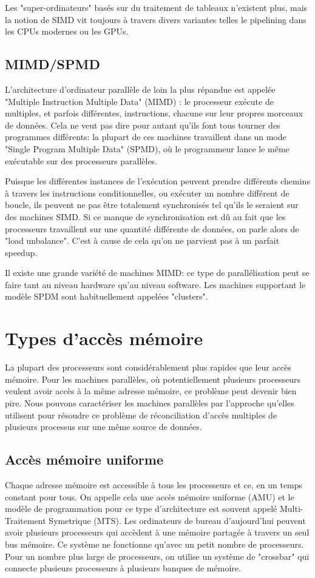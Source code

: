 	Les "super-ordinateurs" basés sur du traitement de tableaux n'existent plus, mais la notion de SIMD vit toujours à travers divers variantes telles le pipelining dans les CPUs modernes ou les GPUs.

	\subsection{MIMD/SPMD}
	L'architecture d'ordinateur parallèle de loin la plus répandue est appelée "Multiple Instruction Multiple Data" (MIMD) : le processeur exécute de multiples, et parfois différentes, instructions, chacune sur leur propres morceaux de données. Cela ne veut pas dire pour autant qu'ils font tous tourner des programmes différents: la plupart de ces machines travaillent dans un mode "Single Program Multiple Data" (SPMD), où le programmeur lance le même exécutable sur des processeurs parallèles.
	
	Puisque les différentes instances de l'exécution peuvent prendre différents chemins à travers les instructions conditionnelles, ou exécuter un nombre différent de boucle, ils peuvent ne pas être totalement synchronisés tel qu'ils le seraient sur des machines SIMD. Si ce manque de synchronisation est dû au fait que les processeurs travaillent sur une quantité différente de données, on parle alors de "load unbalance". C'est à cause de cela qu'on ne parvient pas à un parfait speedup.
	
	Il existe une grande variété de machines MIMD: ce type de parallélisation peut se faire tant au niveau hardware qu'au niveau software. Les machines supportant le modèle SPDM sont habituellement appelées "clusters".
	 
\section{Types d'accès mémoire}
La plupart des processeurs sont considérablement plus rapides que leur accès mémoire. Pour les machines parallèles, où potentiellement plusieurs processeurs veulent avoir accès à la même adresse mémoire, ce problème peut devenir bien pire. Nous pouvons caractériser les machines parallèles par l'approche qu'elles utilisent pour résoudre ce problème de réconciliation d'accès multiples de plusieurs processus sur une même source de données.

	\subsection{Accès mémoire uniforme}
	Chaque adresse mémoire est accessible à tous les processeurs et ce, en un temps constant pour tous. On appelle cela une accès mémoire uniforme (AMU) et le modèle de programmation pour ce type d'architecture est souvent appelé Multi-Traitement Symetrique (MTS). Les ordinateurs de bureau d'aujourd'hui peuvent avoir plusieurs processeurs qui accèdent à une mémoire partagée à travers un seul bus mémoire. Ce système ne fonctionne qu'avec un petit nombre de processeurs. Pour un nombre plus large de processeurs, on utilise un système de "crossbar" qui connecte plusieurs processeurs à plusieurs banques de mémoire.
	
